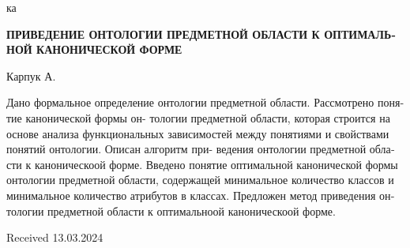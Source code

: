 ка\documentclass[times]{article}
\begin{document}
\begin{otherlanguage}{russian}
    \begin{center}

     \textbf{ПРИВЕДЕНИЕ ОНТОЛОГИИ ПРЕДМЕТНОЙ
     ОБЛАСТИ К ОПТИМАЛЬНОЙ КАНОНИЧЕСКОЙ
     ФОРМЕ}
    
        Карпук А.
    \end{center}
    
    Дано формальное определение онтологии предметной области. Рассмотрено понятие канонической формы он- тологии предметной области, которая строится на основе анализа функциональных зависимостей между понятиями и свойствами понятий онтологии. Описан алгоритм при- ведения онтологии предметной области к каноническоой форме. Введено понятие оптимальной канонической формы онтологии предметной области, содержащей минимальное количество классов и минимальное количество атрибутов в классах. Предложен метод приведения онтологии предметной области к оптимальноой каноническоой форме.
\end{otherlanguage}
\begin{flushright}
    Received 13.03.2024
\end{flushright}
\end{document}
